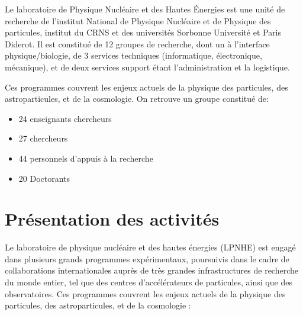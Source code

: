 \documentclass[french,a4paper,12pt]{report}
\begin{document}
  Le laboratoire de Physique Nucléaire et des Hautes Énergies est une unité de recherche de l'institut National de Physique Nucléaire et de Physique des particules, institut du CRNS et des universités Sorbonne Université et Paris Diderot. Il est constitué de 12 groupes de recherche, dont un à l’interface physique/biologie, de 3 services techniques (informatique, électronique, mécanique), et de deux services support étant l'administration et la logistique.
  
  Ces programmes couvrent les enjeux actuels de la physique des particules, des astroparticules, et de la cosmologie.
  On retrouve un groupe constitué de:
  \begin{itemize}
  \item  24 enseignants chercheurs
  \item  27 chercheurs
  \item  44 personnels d'appuis à la recherche
  \item  20 Doctorants
  \end{itemize}
  \newpage
  
  \section{Présentation des activités}
  Le laboratoire de physique nucléaire et des hautes énergies (LPNHE) est engagé dans plusieurs grands programmes expérimentaux, poursuivis dans le cadre de collaborations internationales auprès de très grandes infrastructures de recherche du monde entier, tel que des centres d’accélérateurs de particules, ainsi que des observatoires. Ces programmes couvrent les enjeux actuels de la physique des particules, des astroparticules, et de la cosmologie :
  
\end{document}
